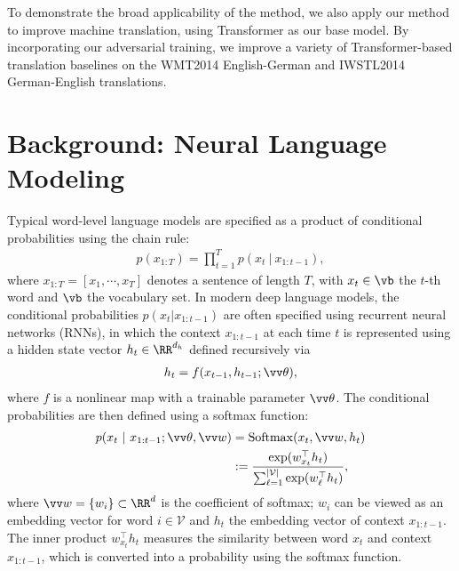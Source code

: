 \documentclass{article}
\newcommand{\softmax}{{\mathrm{Softmax}}}
\begin{document}
To demonstrate the broad applicability of the method, 
we also apply our method to improve machine translation, using 
Transformer \citep{vaswani2017attention} as our base model. 
By incorporating our adversarial training,  
we improve a variety of Transformer-based translation baselines on the WMT2014 English-German and IWSTL2014 German-English translations.








 
\section{Background: Neural Language Modeling}
Typical word-level language models are specified as a product of conditional probabilities using the chain rule: 
\begin{align}\label{cond}
p(x_{1:T}) = \prod_{t=1}^T p(x_t~|~x_{1:t-1}),
\end{align}
where $x_{1:T} = [x_1, \cdots, x_T]$ denotes a sentence of length $T$, with 
$x_t \in \vb$ the $t$-th word and $\vb$ the 
vocabulary set. 
In modern deep language models, the conditional probabilities $p(x_t|x_{1:t-1})$  are often specified using recurrent neural networks (RNNs), 
in which  the context $x_{1:t-1}$ 
at each time $t$ is represented 
using a hidden state vector $h_t \in \RR^{d_h}$ defined recursively via 
\begin{align}
     h_t = f(x_{t-1}, h_{t-1}; \vv\theta),  \label{equ:fht}
\end{align}
where $f$ is a nonlinear map with a trainable parameter $\vv \theta$. 
The conditional probabilities are then defined using a softmax function: \begin{align} 
\begin{split}
p(x_t ~|~x_{1:t-1}; \vv\theta, \vv w) 
& = \softmax(x_{t}, \vv w, h_t) \\& :=  \frac{\exp(w_{x_t}^\top h_t)}{\sum_{\ell =1}^{|\mathcal V|} \exp(w_{\ell}^\top h_t)},
\end{split}
 \label{equ:softmax}
\end{align}
where $\vv w = \{w_i\}\subset \RR^{d}$ is the coefficient of softmax;  
$w_i$ can be viewed as an embedding vector for word $i \in \mathcal V$
and $h_t$ the embedding vector of context $x_{1:t-1}$.  
The inner product $w_{x_t}^\top h_t$ measures the similarity between word $x_t$ and context $x_{1:t-1}$, which is converted into a probability using the softmax function. 
\end{document}
